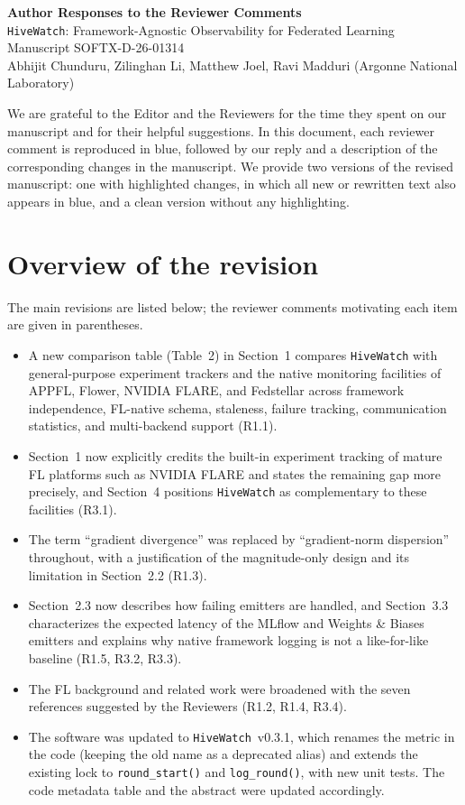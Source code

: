 \documentclass[11pt]{article}
\newcommand{\HW}{\texttt{HiveWatch}}
\begin{document}
\begin{center}
{\Large\textbf{Author Responses to the Reviewer Comments}}\\[4pt]
\HW: Framework-Agnostic Observability for Federated Learning\\
Manuscript SOFTX-D-26-01314\\[2pt]
Abhijit Chunduru, Zilinghan Li, Matthew Joel, Ravi Madduri (Argonne National Laboratory)
\end{center}

We are grateful to the Editor and the Reviewers for the time they spent on our manuscript and for their helpful suggestions. In this document, each reviewer comment is reproduced in blue, followed by our reply and a description of the corresponding changes in the manuscript. We provide two versions of the revised manuscript: one with highlighted changes, in which all new or rewritten text also appears in blue, and a clean version without any highlighting.

\section*{Overview of the revision}
The main revisions are listed below; the reviewer comments motivating each item are given in parentheses.
\begin{itemize}[noitemsep]
    \item A new comparison table (Table~2) in Section~1 compares \HW{} with general-purpose experiment trackers and the native monitoring facilities of APPFL, Flower, NVIDIA FLARE, and Fedstellar across framework independence, FL-native schema, staleness, failure tracking, communication statistics, and multi-backend support (R1.1).
    \item Section~1 now explicitly credits the built-in experiment tracking of mature FL platforms such as NVIDIA FLARE and states the remaining gap more precisely, and Section~4 positions \HW{} as complementary to these facilities (R3.1).
    \item The term ``gradient divergence'' was replaced by ``gradient-norm dispersion'' throughout, with a justification of the magnitude-only design and its limitation in Section~2.2 (R1.3).
    \item Section~2.3 now describes how failing emitters are handled, and Section~3.3 characterizes the expected latency of the MLflow and Weights \& Biases emitters and explains why native framework logging is not a like-for-like baseline (R1.5, R3.2, R3.3).
    \item The FL background and related work were broadened with the seven references suggested by the Reviewers (R1.2, R1.4, R3.4).
    \item The software was updated to \HW{}~v0.3.1, which renames the metric in the code (keeping the old name as a deprecated alias) and extends the existing lock to \texttt{round\_start()} and \texttt{log\_round()}, with new unit tests. The code metadata table and the abstract were updated accordingly.
\end{itemize}
\end{document}
